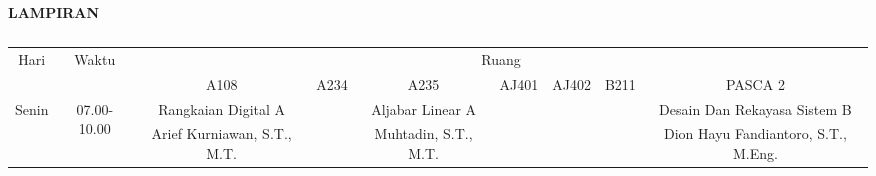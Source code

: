 \begin{center}
    \Large
    \textbf{LAMPIRAN}
  \end{center}
\begin{table}[]
  \centering
  \caption{}
  \label{tab:my-table}
  \begin{tabular}{|c|c|ccccccc|}
  \hline
  \multirow{2}{*}{Hari}   & \multirow{2}{*}{Waktu}       & \multicolumn{7}{c|}{Ruang}                                                                                                                                                                                                                                                                                                                                                                                                                                               \\ \cline{3-9} 
                          &                              & \multicolumn{1}{c|}{A108}                                         & \multicolumn{1}{c|}{A234}                                          & \multicolumn{1}{c|}{A235}                                     & \multicolumn{1}{c|}{AJ401}                                           & \multicolumn{1}{c|}{AJ402}                                        & \multicolumn{1}{c|}{B211}                                          & PASCA 2                                         \\ \hline
  \multirow{6}{*}{Senin}  & \multirow{2}{*}{07.00-10.00} & \multicolumn{1}{c|}{Rangkaian Digital A}                          & \multicolumn{1}{c|}{}                                              & \multicolumn{1}{c|}{Aljabar Linear A}                         & \multicolumn{1}{c|}{}                                                & \multicolumn{1}{c|}{}                                             & \multicolumn{1}{c|}{}                                              & Desain Dan Rekayasa   Sistem B                  \\ \cline{3-9} 
                          &                              & \multicolumn{1}{c|}{Arief Kurniawan, S.T., M.T.}                  & \multicolumn{1}{c|}{}                                              & \multicolumn{1}{c|}{Muhtadin, S.T., M.T.}                     & \multicolumn{1}{c|}{}                                                & \multicolumn{1}{c|}{}                                             & \multicolumn{1}{c|}{}                                              & Dion Hayu   Fandiantoro, S.T., M.Eng.           \\ \cline{2-9} 

\end{tabular}
\end{table}
